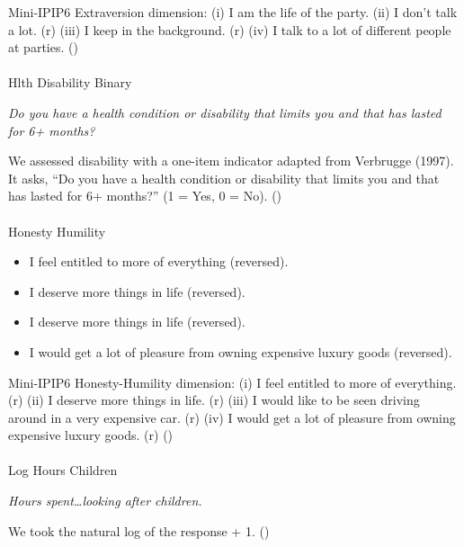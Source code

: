 \documentclass[
  single column]{article}
\makeatletter
\let\oldparagraph\paragraph
\renewcommand{\paragraph}{
    \@ifstar
      \xxxParagraphStar
      \xxxParagraphNoStar
  }
\newcommand{\xxxParagraphStar}[1]{\oldparagraph*{#1}\mbox{}}
\newcommand{\xxxParagraphNoStar}[1]{\oldparagraph{#1}\mbox{}}
\providecommand{\tightlist}{%
  \setlength{\itemsep}{0pt}\setlength{\parskip}{0pt}}\usepackage{longtable,booktabs,array}
\makeatother
\begin{document}
Mini-IPIP6 Extraversion dimension: (i) I am the life of the party. (ii)
I don't talk a lot. (r) (iii) I keep in the background. (r) (iv) I talk
to a lot of different people at parties.
()

\paragraph{Hlth Disability Binary}\label{hlth-disability-binary}

\emph{Do you have a health condition or disability that limits you and
that has lasted for 6+ months?}

We assessed disability with a one-item indicator adapted from Verbrugge
(1997). It asks, ``Do you have a health condition or disability that
limits you and that has lasted for 6+ months?'' (1 = Yes, 0 = No).
()

\paragraph{Honesty Humility}\label{honesty-humility}

\begin{itemize}
\tightlist
\item
  I feel entitled to more of everything (reversed).
\item
  I deserve more things in life (reversed).
\item
  I deserve more things in life (reversed).
\item
  I would get a lot of pleasure from owning expensive luxury goods
  (reversed).
\end{itemize}

Mini-IPIP6 Honesty-Humility dimension: (i) I feel entitled to more of
everything. (r) (ii) I deserve more things in life. (r) (iii) I would
like to be seen driving around in a very expensive car. (r) (iv) I would
get a lot of pleasure from owning expensive luxury goods. (r)
()

\paragraph{Log Hours Children}\label{log-hours-children}

\emph{Hours spent\ldots looking after children.}

We took the natural log of the response + 1.
()
\end{document}
